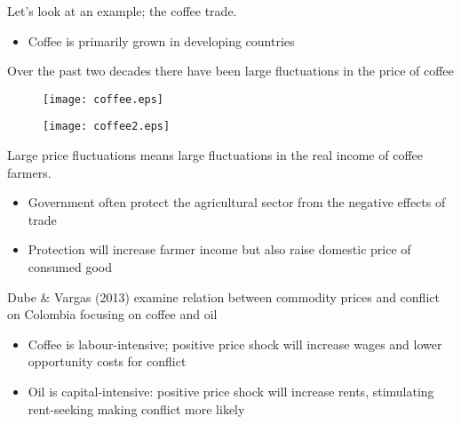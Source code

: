 \documentclass{beamer}
\begin{document}
\begin{frame}
  Let's look at an example; the coffee trade. 
  \begin{itemize}
    \item Coffee is primarily grown in developing countries    
  \end{itemize}
  \medskip
  Over the past two decades there have been large fluctuations in the price of coffee
\end{frame}

\begin{frame}
  \begin{figure}
    \texttt{[image: coffee.eps]}
  \end{figure}
\end{frame}

\begin{frame}
  \begin{figure}
    \texttt{[image: coffee2.eps]}
  \end{figure}
\end{frame}

\begin{frame}
  Large price fluctuations means large fluctuations in the real income of coffee farmers.
  \begin{itemize}
    \item Government often protect the agricultural sector from the negative effects of trade
    \item Protection will increase farmer income but also raise domestic price of consumed good
  \end{itemize}
\end{frame}

\begin{frame}
  Dube \& Vargas (2013) examine relation between commodity prices and conflict on Colombia focusing on coffee and oil
  \medskip
  \begin{itemize}
    \item Coffee is labour-intensive; positive price shock will increase wages and lower opportunity costs for conflict
    \item Oil is capital-intensive: positive price shock will increase rents, stimulating rent-seeking making conflict more likely
  \end{itemize}
\end{frame}
\end{document}
